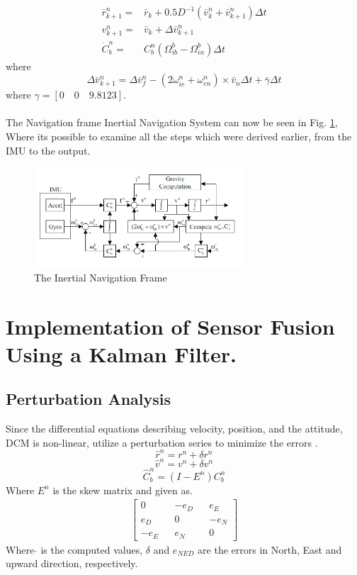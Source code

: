 \begin{align}
\bar{r}_{k+1}^n = & \bar{r}_k + 0.5D^{-1}(\bar{v}_k^n + \bar{v}_{k+1}^n)\Delta t
\label{Eq.r_n_d}\\
v_{k+1}^n= & \bar{v}_k + \Delta \bar{v}_{k+1}^n
\label{Eq.v_n_d}\\
\dot{C}_b^n = & C_b^n(\Omega_{ib}^b - \Omega_{in}^b)\Delta t
\label{Eq.C_b_n_d}
\end{align}
where 
\begin{equation}
\Delta \bar{v}_{k+1}^n = \Delta \bar{v}_f^n - (2\omega_{ie}^n+\omega_{en}^n) \times \bar{v}_n \Delta t +\bar{\gamma}\Delta t
\end{equation}
where $\gamma = [0 \quad 0 \quad 9.8123]$.\\ \\
The Navigation frame Inertial Navigation System can now be seen in Fig. \ref{Fig:body_frame}, Where its possible to examine all the steps which were derived earlier, from the IMU to the output.
\begin{figure}[H]
\centering
\includegraphics[width=0.7\textwidth]{Figures/ins_2}
\caption{The Inertial Navigation Frame}
\label{Fig:body_frame}
\end{figure}
\section{Implementation of Sensor Fusion Using a Kalman Filter.}
\subsection*{Perturbation Analysis}
Since the differential equations describing velocity, position, and the attitude, DCM is non-linear, utilize a perturbation series to minimize the errors \cite{pertubation}.
\begin{equation}
\hat{r}^n =r^n+\delta r^n
\label{Eq.per_r}
\end{equation}
\begin{equation}
\hat{v}^n =v^n+\delta v^n
\label{Eq.per_v}
\end{equation}
\begin{equation}
\hat{C}_b^n = (I-E^n)C_b^n
\label{Eq.per_c}
\end{equation}
Where $E^n$ is the skew matrix and given as.
\begin{align}
\begin{bmatrix} 
0 && -e_D && e_E \\
e_D && 0 && -e_N \\
-e_E && e_N && 0
\end{bmatrix}
\end{align}
Where $\hat{}$ is the computed values, $\delta$ and $e_{NED}$ are the errors in North, East and upward direction, respectively.

